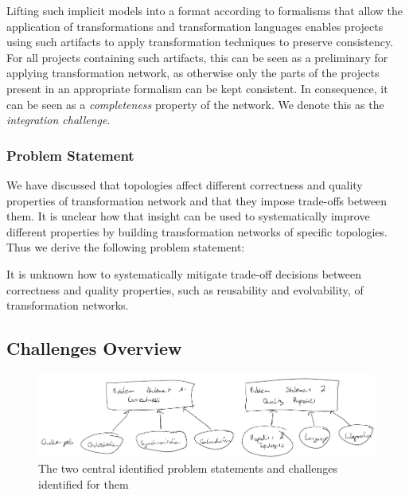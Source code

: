 Lifting such implicit models into a format according to formalisms that allow the application of transformations and transformation languages enables projects using such artifacts to apply transformation techniques to preserve consistency.
For all projects containing such artifacts, this can be seen as a preliminary for applying transformation network, as otherwise only the parts of the projects present in an appropriate formalism can be kept consistent.
In consequence, it can be seen as a \emph{completeness} property of the network.
We denote this as the \emph{integration challenge}.

\subsubsection*{Problem Statement}

We have discussed that topologies affect different correctness and quality properties of transformation network and that they impose trade-offs between them.
It is unclear how that insight can be used to systematically improve different properties by building transformation networks of specific topologies.
Thus we derive the following problem statement:

\begin{problemstatement}
    It is unknown how to systematically mitigate trade-off decisions between correctness and quality properties, such as reusability and evolvability, of transformation networks.
\end{problemstatement}


\subsection{Challenges Overview}

\begin{figure}
    \centering
    \includegraphics[width=\textwidth]{figures/prologue/challenges.png}
    \caption[Problem statements and challenges]{The two central identified problem statements and challenges identified for them}
    \label{fig:prologue:challenges}
\end{figure}


